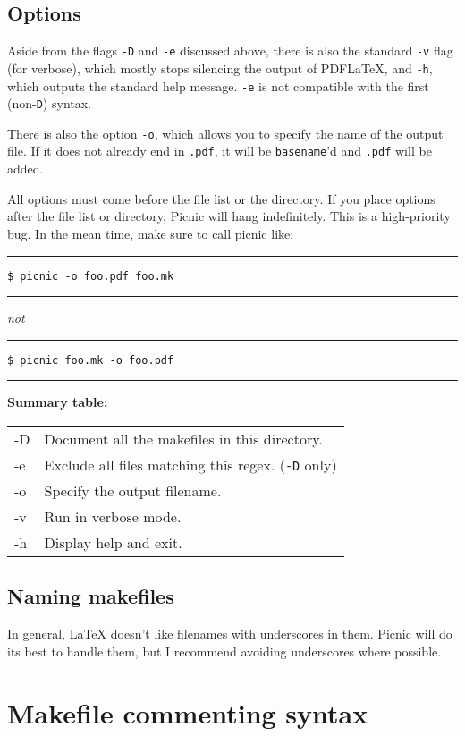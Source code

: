 \documentclass[oneside,11pt]{article}
\newcommand{\bashcmd}[1]{ \hfill\, \begin{minipage}[t]{\linewidth}  \hrule \vspace{0.5\baselineskip} \texttt{\small \$ #1} \vspace{0.5\baselineskip} \hrule \end{minipage} \vspace{0.5\baselineskip} }
\begin{document}
	\subsection{Options}
	
	Aside from the flags \texttt{-D} and \texttt{-e} discussed above, there is also the standard \texttt{-v} flag (for verbose), which mostly stops silencing the output of PDF\LaTeX, and \texttt{-h}, which outputs the standard help message. \texttt{-e} is not compatible with the first (non-\texttt{D}) syntax.
	
	There is also the option \texttt{-o}, which allows you to specify the name of the output file. If it does not already end in \texttt{.pdf}, it will be \texttt{basename}'d and \texttt{.pdf} will be added.
	
	{\color{red} All options must come before the file list or the directory.} If you place options after the file list or directory, Picnic will hang indefinitely. This is a high-priority bug. In the mean time, make sure to call picnic like:	
	\bashcmd{picnic -o foo.pdf foo.mk}
	
	\textit{not}	
	\bashcmd{picnic foo.mk -o foo.pdf}
	
	\begin{minipage}{\textwidth}
		\textbf{Summary table:}	\\
		\begin{tabularx}{\textwidth}{>{\ttfamily}l X}
			-D & Document all the makefiles in this directory. \\
			-e & Exclude all files matching this regex. (\texttt{-D} only) \\
			-o & Specify the output filename. \\
			-v & Run in verbose mode. \\
			-h & Display help and exit.  \\
		\end{tabularx}
	\end{minipage}
		
	\subsection{Naming makefiles}
	
	In general, \LaTeX{} doesn't like filenames with underscores in them. Picnic will do its best to handle them, but I recommend avoiding underscores where possible. 
	
	\section{Makefile commenting syntax}
	
\end{document}
